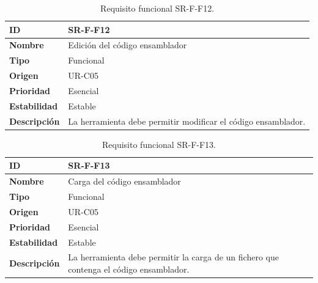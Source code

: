 \begin{center}
\begin{table}[htbp]
\centering
\caption{Requisito funcional SR-F-F12.}
\begin{tabular}{@{}p{2.5cm} p{9cm}@{}} 
\toprule
\textbf{ID} 				& SR-F-F12 \\
\midrule
\textbf{Nombre} 			& Edición del código \gls{ensamblador}\\
\midrule
\textbf{Tipo} 			& Funcional \\
\midrule
\textbf{Origen} 			& UR-C05 \\
\midrule
\textbf{Prioridad}		& Esencial \\
\midrule
\textbf{Estabilidad} 		& Estable \\
\midrule
\textbf{Descripción} 	& La herramienta debe permitir modificar el código \gls{ensamblador}. \\
\bottomrule
\end{tabular}
\label{tab:srff12}
\end{table}
\end{center}

\begin{center}
\begin{table}[htbp]
\centering
\caption{Requisito funcional SR-F-F13.}
\begin{tabular}{@{}p{2.5cm} p{9cm}@{}} 
\toprule
\textbf{ID} 				& SR-F-F13 \\
\midrule
\textbf{Nombre} 			& Carga del código \gls{ensamblador}\\
\midrule
\textbf{Tipo} 			& Funcional \\
\midrule
\textbf{Origen} 			& UR-C05 \\
\midrule
\textbf{Prioridad}		& Esencial \\
\midrule
\textbf{Estabilidad} 		& Estable \\
\midrule
\textbf{Descripción} 	& La herramienta debe permitir la carga de un fichero que contenga el código \gls{ensamblador}. \\
\bottomrule
\end{tabular}
\label{tab:srff13}
\end{table}
\end{center}

